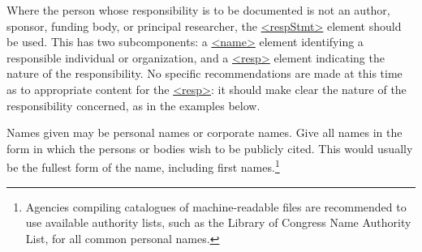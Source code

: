 Where the person whose responsibility is to be documented is not an author, sponsor, funding body, or principal researcher, the \hyperref[TEI.respStmt]{<respStmt>} element should be used. This has two subcomponents: a \hyperref[TEI.name]{<name>} element identifying a responsible individual or organization, and a \hyperref[TEI.resp]{<resp>} element indicating the nature of the responsibility. No specific recommendations are made at this time as to appropriate content for the \hyperref[TEI.resp]{<resp>}: it should make clear the nature of the responsibility concerned, as in the examples below.\par
Names given may be personal names or corporate names. Give all names in the form in which the persons or bodies wish to be publicly cited. This would usually be the fullest form of the name, including first names.\footnote{Agencies compiling catalogues of machine-readable files are recommended to use available authority lists, such as the Library of Congress Name Authority List, for all common personal names.}\par
